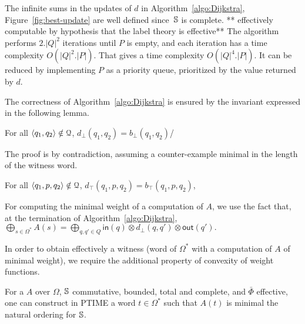\noindent
{}
The infinite sums in the updates of $d$ in Algorithm~\ref{algo:Dijkstra}, 
Figure~\ref{fig:best-update}
are well defined
since~$\mathbb{S}$ is complete.
** effectively computable by hypothesis that the label theory is effective**
The algorithm performs $2.|Q|^2$ iterations until $P$ is empty, 
and each iteration has a time complexity $O(|Q|^2 . |P|)$.
That gives a time complexity $O(|Q|^4 . |P|)$. 
It can be reduced by implementing $P$ as a priority queue, 
prioritized by the value returned by $d$.

The correctness of Algorithm~\ref{algo:Dijkstra} 
is ensured by the invariant expressed in the following lemma.
\begin{lemma}\label{lem:bot}
For all $\< q_1, q_2> \notin \Q$,
$d_\bot(q_1, q_2) =  b_\bot(q_1, q_2)$/
\end{lemma}
The proof is by contradiction, 
assuming a counter-example minimal in the length of the witness word.

\begin{lemma}\label{lem:top}
For all $\< q_1, p, q_2> \notin \Q$, 
$d_\top(q_1, p, q_2) =  b_\top(q_1, p, q_2)$,
\end{lemma}

\noindent
For computing the minimal weight of a computation of $A$, we use the fact that,
at the termination of Algorithm~\ref{algo:Dijkstra}, %
\(
  {\displaystyle \bigoplus_{s \in \Omega^*} A(s)} = 
  {\displaystyle\bigoplus_{q, q' \in Q}} \textstyle
  \mathsf{in}(q) \mathop{\otimes} d_\bot(q, q') \mathop{\otimes} \mathsf{out}(q').
\)

\noindent
In order to obtain effectively a witness 
(word of $\Omega^*$ with a computation of $A$ of minimal weight), 
we require the additional property of convexity of weight functions.

\begin{proposition}\label{th:best-search}
For a \SWVPA $A$ 
over $\Omega$, 
$\mathbb{S}$ commutative, bounded, total and complete, %
and $\bar\Phi$ effective, %
one can construct in PTIME a word $t \in \Omega^*$ 
such that $A(t)$ is minimal \wrt the natural ordering for $\mathbb{S}$. 
\end{proposition} 





